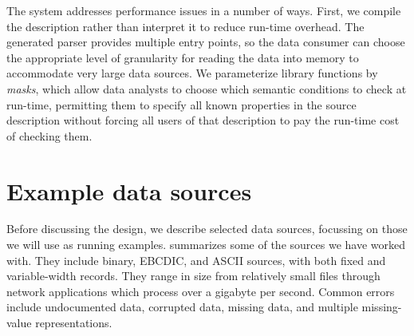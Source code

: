 \documentclass{sig-alternate}
\begin{document}
The \pads{} system addresses performance issues in a number of ways.
First, we compile the \pads{} description rather than interpret it to reduce run-time overhead.
The generated parser provides  multiple entry points, so the data consumer can choose 
the appropriate level of granularity for reading the data into memory to accommodate very large data sources.
We parameterize library functions by \textit{masks}, which allow data analysts to 
choose which semantic conditions to check at run-time, permitting them to specify
all known properties in the source description without forcing all users of that 
description to pay the run-time cost of checking them.  


\section{Example data sources}
Before discussing the \pads{} design, we describe selected data sources, focussing on those we will use as running examples.    summarizes some of the sources we have worked with.  They include binary, EBCDIC, and ASCII sources, with both fixed and variable-width records.  They range in size from relatively small files through network applications which process over a gigabyte per second.  Common errors include undocumented data, corrupted data, missing data, and multiple missing-value representations.  
\end{document}
